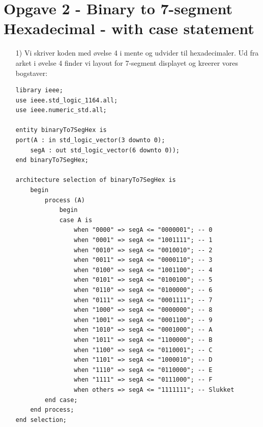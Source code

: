 \section{Opgave 2 - Binary to 7-segment Hexadecimal - with case statement}
\begin{enumerate}
	\item[1)] Vi skriver koden med øvelse 4 i mente og udvider til hexadecimaler. Ud fra arket i øvelse 4 finder vi layout for 7-segment displayet og kreerer vores bogstaver:
\begin{lstlisting}[caption={Behavioral style binær til 7-segment hexadecimal},label={lst:binto7seghexa}]
library ieee;
use ieee.std_logic_1164.all;
use ieee.numeric_std.all;

entity binaryTo7SegHex is
port(A : in std_logic_vector(3 downto 0);
	segA : out std_logic_vector(6 downto 0));
end binaryTo7SegHex;

architecture selection of binaryTo7SegHex is
	begin
		process (A)
			begin
			case A is
				when "0000" => segA <= "0000001"; -- 0
				when "0001" => segA <= "1001111"; -- 1
				when "0010" => segA <= "0010010"; -- 2
				when "0011" => segA <= "0000110"; -- 3
				when "0100" => segA <= "1001100"; -- 4
				when "0101" => segA <= "0100100"; -- 5
				when "0110" => segA <= "0100000"; -- 6
				when "0111" => segA <= "0001111"; -- 7
				when "1000" => segA <= "0000000"; -- 8
				when "1001" => segA <= "0001100"; -- 9
				when "1010" => segA <= "0001000"; -- A
				when "1011" => segA <= "1100000"; -- B
				when "1100" => segA <= "0110001"; -- C
				when "1101" => segA <= "1000010"; -- D
				when "1110" => segA <= "0110000"; -- E
				when "1111" => segA <= "0111000"; -- F
				when others => segA <= "1111111"; -- Slukket
		end case;
	end process;
end selection;
\end{lstlisting}


\end{enumerate}
